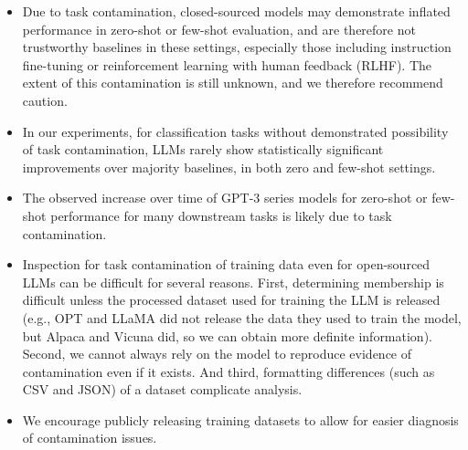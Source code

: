 \documentclass[letterpaper]{article} %
\newcommand{\nilay}[1]{}
\newcommand{\jmfb}[1]{}      %
\begin{document}
\begin{itemize}
    \item Due to task contamination, closed-sourced models may demonstrate inflated performance in zero-shot or few-shot evaluation, and are therefore not trustworthy baselines in these settings, especially those including instruction fine-tuning or reinforcement learning with human feedback (RLHF)\nilay{cite RLHF here?}. The extent of this contamination is still unknown, and we therefore recommend caution.

    \item In our experiments, for classification tasks without demonstrated possibility of task contamination, LLMs rarely show statistically significant improvements over majority baselines, in both zero and few-shot settings.

    \item The observed increase over time of GPT-3 series models for zero-shot or few-shot performance for many downstream tasks is likely due to task contamination. \nilay{kinda the same as the previous bullet. Think we can remove?}

    \item Inspection for task contamination of training data even for open-sourced LLMs can be difficult for several reasons. First, determining membership is difficult unless the processed dataset used for training the LLM is released (e.g., OPT and LLaMA did not release the data they used to train the model, but Alpaca and Vicuna did, so we can obtain more definite information). Second, we cannot always rely on the model to reproduce evidence of contamination even if it exists. And third, formatting differences (such as CSV and JSON) of a dataset complicate analysis.

    \item We encourage publicly releasing training datasets to allow for easier diagnosis of contamination issues. \nilay{Also related to previous bullet, we can probably find a way to merge these}
    
\end{itemize}

\jmfb{Recommend Against Using Highest Performing Closed Models as Baselines, since they may not be zero or few-shot.}

\jmfb{Performance increase over time for GPT-3, partially due to dataset contamination}
\end{document}
